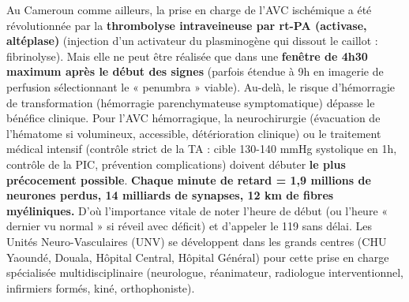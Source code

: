 \documentclass[11pt]{article}
\begin{document}
\begin{savaistu}
Au Cameroun comme ailleurs, la prise en charge de l'AVC ischémique a été révolutionnée par la \textbf{thrombolyse intraveineuse par rt-PA (activase, altéplase)} (injection d'un activateur du plasminogène qui dissout le caillot : fibrinolyse). Mais elle ne peut être réalisée que dans une \textbf{fenêtre de 4h30 maximum après le début des signes} (parfois étendue à 9h en imagerie de perfusion sélectionnant le « penumbra » viable). Au-delà, le risque d'hémorragie de transformation (hémorragie parenchymateuse symptomatique) dépasse le bénéfice clinique. Pour l'AVC hémorragique, la neurochirurgie (évacuation de l'hématome si volumineux, accessible, détérioration clinique) ou le traitement médical intensif (contrôle strict de la TA : cible 130-140 mmHg systolique en 1h, contrôle de la PIC, prévention complications) doivent débuter \textbf{le plus précocement possible}. \textbf{Chaque minute de retard = 1,9 millions de neurones perdus, 14 milliards de synapses, 12 km de fibres myéliniques.} D'où l'importance vitale de noter l'heure de début (ou l'heure « dernier vu normal » si réveil avec déficit) et d'appeler le 119 sans délai. Les Unités Neuro-Vasculaires (UNV) se développent dans les grands centres (CHU Yaoundé, Douala, Hôpital Central, Hôpital Général) pour cette prise en charge spécialisée multidisciplinaire (neurologue, réanimateur, radiologue interventionnel, infirmiers formés, kiné, orthophoniste).
\end{savaistu}
\end{document}
